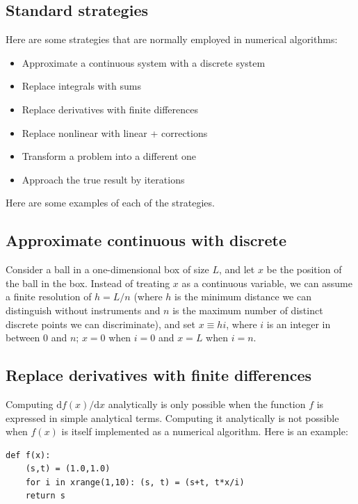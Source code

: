 \documentclass[justified,sixbynine]{tufte-book}
\theoremstyle{plain}%
\theoremstyle{definition}
\theoremstyle{remark}
\begin{document}
\begin{fullwidth}
\goodbreak\section{Standard strategies}

Here are some strategies that are normally employed in numerical algorithms:

\begin{itemize}
\item Approximate a continuous system with a discrete system
\item Replace integrals with sums
\item Replace derivatives with finite differences
\item Replace nonlinear with linear + corrections
\item Transform a problem into a different one
\item Approach the true result by iterations
\end{itemize}

Here are some examples of each of the strategies.

\goodbreak\subsection{Approximate continuous with discrete}

Consider a ball in a one-dimensional box of size $L$, and let $x$ be the position of the ball in the box. Instead of treating $x$ as a continuous variable, we can assume a finite resolution of $h = L/n$ (where $h$ is the minimum distance we can distinguish without instruments and $n$ is the maximum number of distinct discrete points we can discriminate), and set $x \equiv h i$, where $i$ is an integer in between $0$ and $n$; $x=0$ when $i=0$ and $x=L$ when $i=n$.


\goodbreak\subsection{Replace derivatives with finite differences}


Computing $\textrm{d}f(x)/\textrm{d}x$ analytically is only possible when the function $f$ is expressed in simple analytical terms. Computing it analytically is not possible when $f(x)$ is itself implemented as a numerical algorithm. Here is an example:

\begin{lstlisting}
def f(x):
    (s,t) = (1.0,1.0)
    for i in xrange(1,10): (s, t) = (s+t, t*x/i)
    return s
\end{lstlisting}


\end{fullwidth}
\end{document}
